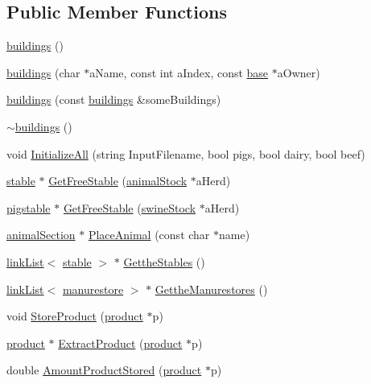 \subsection*{Public Member Functions}
\begin{DoxyCompactItemize}
\item 
\hyperlink{classbuildings_affec7e1c753303f692e258d9adc3756a}{buildings} ()
\item 
\hyperlink{classbuildings_a3ed50eab88a240e472b7a26e6aaf6ecc}{buildings} (char $\ast$aName, const int aIndex, const \hyperlink{classbase}{base} $\ast$aOwner)
\item 
\hyperlink{classbuildings_a73c0a2677e231fa95a78cd153dddc2ce}{buildings} (const \hyperlink{classbuildings}{buildings} \&someBuildings)
\item 
\hyperlink{classbuildings_a4d070dc7165028bfc384c66d54c5d41a}{$\sim$buildings} ()
\item 
void \hyperlink{classbuildings_aed6e79504b2bb19179d9aa4a06e1ba02}{InitializeAll} (string InputFilename, bool pigs, bool dairy, bool beef)
\item 
\hyperlink{classstable}{stable} $\ast$ \hyperlink{classbuildings_ab5f3304118e2662e0e53867aaf99a1dd}{GetFreeStable} (\hyperlink{classanimal_stock}{animalStock} $\ast$aHerd)
\item 
\hyperlink{classpigstable}{pigstable} $\ast$ \hyperlink{classbuildings_a550d0127d0d4c8a4f497b4bc9fb30bcf}{GetFreeStable} (\hyperlink{classswine_stock}{swineStock} $\ast$aHerd)
\item 
\hyperlink{classanimal_section}{animalSection} $\ast$ \hyperlink{classbuildings_af2943b86173a6a6049c4d52b9793e36e}{PlaceAnimal} (const char $\ast$name)
\item 
\hyperlink{classlink_list}{linkList}$<$ \hyperlink{classstable}{stable} $>$ $\ast$ \hyperlink{classbuildings_ae1d964dd1eea984f929442218a6ca587}{GettheStables} ()
\item 
\hyperlink{classlink_list}{linkList}$<$ \hyperlink{classmanurestore}{manurestore} $>$ $\ast$ \hyperlink{classbuildings_a80de7e67dd8e3ff545151ee8a01171d4}{GettheManurestores} ()
\item 
void \hyperlink{classbuildings_a5ef204b7f1eace35543ea66a8a5c5a39}{StoreProduct} (\hyperlink{classproduct}{product} $\ast$p)
\item 
\hyperlink{classproduct}{product} $\ast$ \hyperlink{classbuildings_a6a0123f0dd6ed6d314e11e5b8107baf5}{ExtractProduct} (\hyperlink{classproduct}{product} $\ast$p)
\item 
double \hyperlink{classbuildings_a503da8794e3f43e19319e097e9b6e40c}{AmountProductStored} (\hyperlink{classproduct}{product} $\ast$p)

\end{DoxyCompactItemize}
